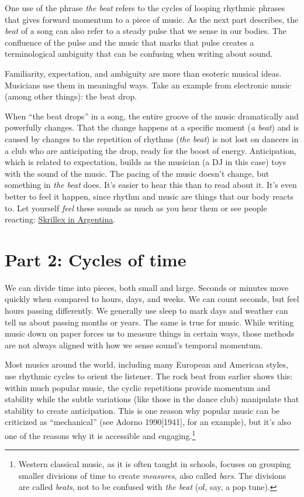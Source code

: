 \documentclass[twoside]{article}
\begin{document}
One use of the phrase \emph{the beat} refers to the cycles of looping rhythmic
phrases that gives forward momentum to a piece of music. As the next
part describes, the \emph{beat} of a song can also refer to a steady pulse that
we sense in our bodies. The confluence of the pulse and the music that
marks that pulse creates a terminological ambiguity that can be
confusing when writing about sound.

Familiarity, expectation, and ambiguity are more than esoteric musical
ideas. Musicians use them in meaningful ways. Take an example from
electronic music (among other things): the beat drop.

When ``the beat drops'' in a song, the entire groove of the music
dramatically and powerfully changes. That the change happens at a
specific moment (\emph{a beat}) and is caused by changes to the repetition of
rhythms (\emph{the beat}) is not lost on dancers in a club who are anticipating
the drop, ready for the boost of energy. Anticipation, which is related
to expectation, builds as the musician (a DJ in this case) toys with the
sound of the music. The pacing of the music doesn't change, but
something in \emph{the beat} does. It's easier to hear this than to read about
it. It's even better to feel it happen, since rhythm and music are
things that our body reacts to. Let yourself \emph{feel} these sounds as much
as you hear them or see people reacting: \href{https://www.youtube.com/embed/nx8bGoNkvSI}{Skrillex in Argentina}.

\hypertarget{part-2-cycles-of-time}{%
\section*{Part 2: Cycles of time}\label{part-2-cycles-of-time}}

We can divide time into pieces, both small and large. Seconds or minutes
move quickly when compared to hours, days, and weeks. We can count
seconds, but feel hours passing differently. We generally use sleep to
mark days and weather can tell us about passing months or years. The
same is true for music. While writing music down on paper forces us to
measure things in certain ways, those methods are not always aligned
with how we sense sound's temporal momentum.

Most musics around the world, including many European and American
styles, use rhythmic cycles to orient the listener. The rock beat from
earlier shows this: within much popular music, the cyclic repetitions
provide momentum and stability while the subtle variations (like those
in the dance club) manipulate that stability to create anticipation.
This is one reason why popular music can be criticized as ``mechanical''
(see Adorno 1990{[}1941{]}, for an example), but it's also one of the
reasons why it is accessible and engaging.\footnote{Western classical
  music, as it is often taught in schools, focuses on grouping smaller
  divisions of time to create \emph{measures}, also called \emph{bars}.
  The divisions are called \emph{beats}, not to be confused with
  \emph{the beat} (of, say, a pop tune).}
\end{document}
